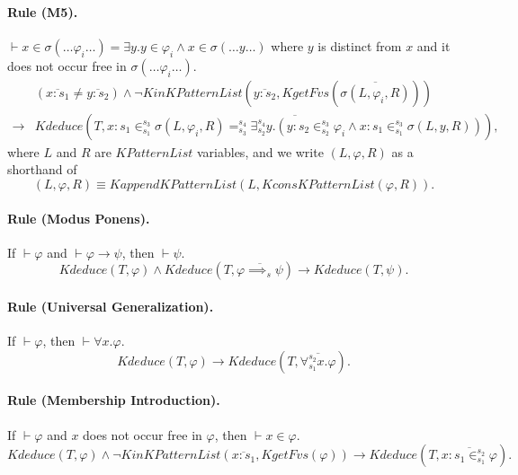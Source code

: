 \documentclass[UTF8,11pt]{article}
\theoremstyle{plain}
\theoremstyle{definition}
\theoremstyle{remark}
\newcommand{\cln}{{:}}
\newcommand{\KPatternList}{\mathit{KPatternList}}
\newcommand{\KconsKPatternList}{\mathit{KconsKPatternList}}
\newcommand{\KappendKPatternList}{\mathit{KappendKPatternList}}
\newcommand{\KinKPatternList}{\mathit{KinKPatternList}}
\newcommand{\KgetFvs}{\mathit{KgetFvs}}
\newcommand{\Kdeduce}{\mathit{Kdeduce}}
\begin{document}
\paragraph{Rule (M5).}
$\vdash x \in \sigma(\dots \varphi_i \dots) = \exists y . y \in \varphi_i \wedge x \in \sigma(\dots y \dots)$ where $y$ is distinct from $x$ and it does not occur free in $\sigma(\dots \varphi_i \dots)$.
\begin{align*}
& (\overline{x \cln s_1} \neq \overline{y \cln s_2}) 
  \wedge \neg \KinKPatternList(\overline{y \cln s_2}, \KgetFvs(\overline{\sigma(L, \varphi_i, R)}))
\\
\to & \Kdeduce(T, \overline{x \cln s_1 \in_{s_1}^{s_3} \sigma(L, 
\varphi_i, R) =_{s_3}^{s_4} \exists_{s_2}^{s_4} y . (y \cln s_2 \in_{s_2}^{s_3} \varphi_i \wedge x \cln s_1 \in_{s_1}^{s_3} \sigma(L, y, R))}),
\end{align*}
where $L$ and $R$ are $\KPatternList$ variables, and we write $(L, \varphi, R)$ as a shorthand of
$$(L, \varphi, R) \equiv \KappendKPatternList(L, \KconsKPatternList(\varphi, R)).$$

\paragraph{Rule (Modus Ponens).}
If $\vdash \varphi$ and $\vdash \varphi \to \psi$, then $\vdash \psi$.
\begin{equation*}
\Kdeduce(T, \varphi) \wedge \Kdeduce(T, \overline{\varphi \implies_s \psi}) \to 
\Kdeduce(T, \psi).
\end{equation*}

\paragraph{Rule (Universal Generalization).}
If $\vdash \varphi$, then $\vdash \forall x . \varphi$.
\begin{equation*}
\Kdeduce(T, \varphi) \to \Kdeduce(T, \overline{\forall_{s_1}^{s_2} x . \varphi}).
\end{equation*}

\paragraph{Rule (Membership Introduction).}
If $\vdash \varphi$ and $x$ does not occur free in $\varphi$, then $\vdash x \in \varphi$.
\begin{equation*}
\Kdeduce(T, \varphi) \wedge \neg \KinKPatternList(\overline{x \cln s_1}, \KgetFvs(\varphi)) \to \Kdeduce(T, \overline{x \cln s_1 \in_{s_1}^{s_2} \varphi}).
\end{equation*}
\end{document}
